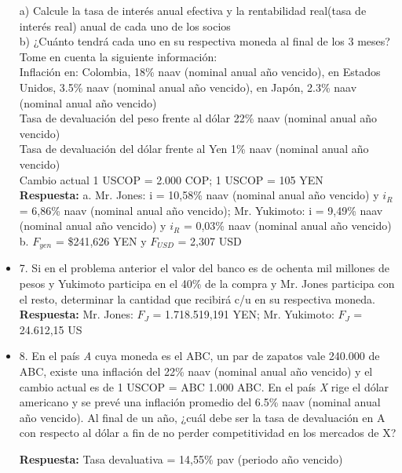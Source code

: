 \begin{itemize}
       a) Calcule la tasa de interés anual efectiva y la rentabilidad real(tasa de interés real) anual de cada uno de los socios\\
       b) ¿Cuánto tendrá cada uno en su respectiva moneda al final de los 3 meses? Tome en cuenta la siguiente información:\\

       Inflación en: Colombia, 18\% naav (nominal anual año vencido), en Estados Unidos, 3.5\% naav (nominal anual año vencido), en Japón, 2.3\%  naav (nominal anual año vencido)\\
       Tasa de devaluación del peso frente al dólar 22\%  naav (nominal anual año vencido)\\
       Tasa de devaluación del dólar frente al Yen 1\% naav (nominal anual año vencido)\\
       Cambio actual 1 USCOP = 2.000 COP; 1 USCOP = 105 YEN\\
       \textbf{Respuesta:} a. Mr. Jones: i = 10,58\% naav (nominal anual año vencido) y $i_{R}$ = 6,86\% naav (nominal anual año vencido); Mr. Yukimoto: i = 9,49\% naav (nominal anual año vencido) y $i_{R}$ = 0,03\% naav (nominal anual año vencido)\\
       b. $F_{yen}$ = \$241,626 YEN y $F_{USD}$ = 2,307 USD\\
      \medskip

 \item 7. Si en el problema anterior el valor del banco es de ochenta mil millones de pesos y Yukimoto  participa en el 40\% de la compra y Mr. Jones participa con el resto, determinar la cantidad que  recibirá c/u en su respectiva moneda.\\
      \textbf{Respuesta:} Mr. Jones: $F_{J}$ = 1.718.519,191 YEN; Mr. Yukimoto: $F_{J}$ = 24.612,15 US\\
      \medskip

 \item 8. En el país \textit{A} cuya moneda es el ABC, un par de zapatos vale 240.000 de ABC, existe una inflación  del 22\% naav (nominal anual año vencido) y el cambio actual es de 1 USCOP = ABC 1.000 ABC. En el país \textit{X} rige el dólar americano y se prevé  una inflación promedio del 6.5\% naav (nominal anual año vencido). Al final de un año, ¿cuál debe ser la tasa de devaluación en A con respecto al dólar a fin de no perder competitividad en los mercados de X?
 
      \textbf{Respuesta:} Tasa devaluativa = 14,55\% pav (periodo año vencido)\\
       \medskip


\end{itemize}
